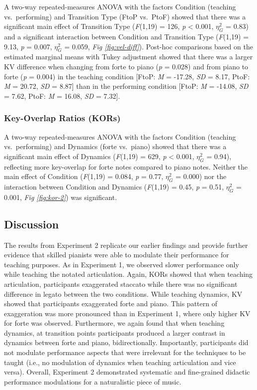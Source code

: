 \documentclass[
  man,floatsintext]{apa6}
\begin{document}
A two-way repeated-measures ANOVA with the factors Condition (teaching vs.~performing) and Transition Type (FtoP vs.~PtoF) showed that there was a significant main effect of Transition Type (\emph{F}(1,19) = 126, \emph{p} \textless{} 0.001, \(\eta_G^2\) = 0.83) and a significant interaction between Condition and Transition Type (\emph{F}(1,19) = 9.13, \emph{p} = 0.007, \(\eta_G^2\) = 0.059, \emph{Fig \ref{fig:vel-diff}}). Post-hoc comparisons based on the estimated marginal means with Tukey adjustment showed that there was a larger KV difference when changing from forte to piano (\emph{p} = 0.028) and from piano to forte (\emph{p} = 0.004) in the teaching condition {[}FtoP: \emph{M} = -17.28, \emph{SD} = 8.17, PtoF: \emph{M} = 20.72, \emph{SD} = 8.87{]} than in the performing condition {[}FtoP: \emph{M} = -14.08, \emph{SD} = 7.62, PtoF: \emph{M} = 16.08, \emph{SD} = 7.32{]}.

\hypertarget{key-overlap-ratios-kors-1}{%
\subsubsection{Key-Overlap Ratios (KORs)}\label{key-overlap-ratios-kors-1}}

A two-way repeated-measures ANOVA with the factors Condition (teaching vs.~performing) and Dynamics (forte vs.~piano) showed that there was a significant main effect of Dynamics (\emph{F}(1,19) = 629, \emph{p} \textless{} 0.001, \(\eta_G^2\) = 0.94), reflecting more key-overlap for forte notes compared to piano notes. Neither the main effect of Condition (\emph{F}(1,19) = 0.084, \emph{p} = 0.77, \(\eta_G^2\) = 0.000) nor the interaction between Condition and Dynamics (\emph{F}(1,19) = 0.45, \emph{p} = 0.51, \(\eta_G^2\) = 0.001, \emph{Fig \ref{fig:kor-2}}) was significant.

\hypertarget{discussion-1}{%
\subsection{Discussion}\label{discussion-1}}

The results from Experiment 2 replicate our earlier findings and provide further evidence that skilled pianists were able to modulate their performance for teaching purposes. As in Experiment 1, we observed slower performance only while teaching the notated articulation. Again, KORs showed that when teaching articulation, participants exaggerated staccato while there was no significant difference in legato between the two conditions. While teaching dynamics, KV showed that participants exaggerated forte and piano. This pattern of exaggeration was more pronounced than in Experiment 1, where only higher KV for forte was observed. Furthermore, we again found that when teaching dynamics, at transition points participants produced a larger contrast in dynamics between forte and piano, bidirectionally. Importantly, participants did not modulate performance aspects that were irrelevant for the techniques to be taught (i.e., no modulation of dynamics when teaching articulation and vice versa). Overall, Experiment 2 demonstrated systematic and fine-grained didactic performance modulations for a naturalistic piece of music.
\end{document}
